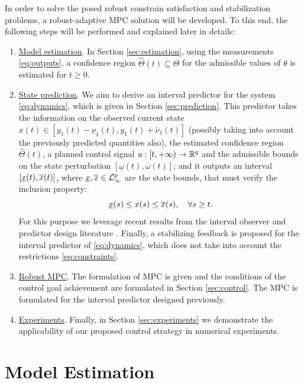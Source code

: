 \documentclass[letterpaper, 10 pt, conference]{ieeeconf}  %
\begin{document}
In order to solve the posed robust constrain satisfaction and stabilization
problems, a robust-adaptive MPC solution \cite{Fukushima2007,Adetola2009,Adetola2011}
will be developed. To this end, the following steps will be performed
and explained later in details:
\begin{enumerate}
\item \uline{Model estimation}. In Section \ref{sec:estimation}, using
the measurements \eqref{eq:outputs}, a confidence region $\hat{\Theta}(t)\subseteq\Theta$
for the admissible values of $\theta$ is estimated for $t\geq0$.
\item \uline{State prediction}. We aim to derive an interval predictor
\cite{Dinh2014,leurent2019interval} for the system \eqref{eq:dynamics},
which is given in Section \ref{sec:prediction}. This predictor takes
the information on the observed current state $x(t)\in[y_{1}(t)-\underline{\nu}_{1}(t),y_{1}(t)+\overline{\nu}_{1}(t)]$
(possibly taking into account the previously predicted quantities
also), the estimated confidence region $\hat{\Theta}(t)$, a planned
control signal $u:[t,+\infty)\to\mathbb{R}^{q}$ and the admissible bounds
on the state perturbation $[\underline{\omega}(t),\overline{\omega}(t)]$;
and it outputs an interval $[\underline{x}(t),\overline{x}(t)]$, where $\underline{x},\overline{x}\in\mathcal{L}_{\infty}^{p}$
are the state bounds, that must verify the inclusion property: 
\begin{equation}
\underline{x}(s)\leq x(s)\leq\overline{x}(s),\quad\forall s\geq t.\label{eq:inclusion-generic}
\end{equation}
For this purpose we leverage recent results from the interval observer
and predictor design literature \cite{Dinh2014,leurent2019interval}.
Finally, a stabilizing feedback is proposed for the interval predictor
of \eqref{eq:dynamics}, which does not take into account the restrictions
\eqref{eq:constraints}.
\item \uline{Robust MPC}. The formulation of MPC is given and the conditions
of the control goal achievement are formulated in Section \ref{sec:control}.
The MPC is formulated for the interval predictor designed previously. 
\item \uline{Experiments}. Finally, in Section \ref{sec:experiments}
we demonstrate the applicability of our proposed control strategy
in numerical experiments.
\end{enumerate}

\section{\label{sec:estimation} Model Estimation}
\end{document}
